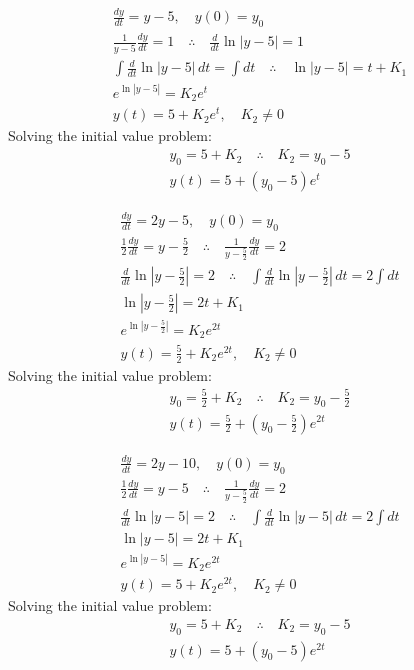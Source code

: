 \begin{solution}
	\begin{solparts}
		\item
		\begin{gather*}
			\frac{dy}{dt}=y-5, \quad y(0)=y_0\\
			\frac{1}{y-5}\frac{dy}{dt}=1 \quad \therefore \quad \frac{d}{dt}\ln|y-5|=1\\
			\int \frac{d}{dt}\ln|y-5| \, dt=\int dt \quad \therefore \quad \ln|y-5|=t+K_1\\
			e^{\ln|y-5|}=K_2e^t\\
			y(t)=5+K_2e^t,\quad K_2 \neq 0
		\end{gather*}
			Solving the initial value problem:
		\begin{gather*}
			y_0=5+K_2 \quad \therefore \quad K_2=y_0-5\\
			\boxed{y(t)=5+(y_0-5)e^t}
		\end{gather*}
		
		\item 
		\begin{gather*}
			\frac{dy}{dt}=2y-5, \quad y(0)=y_0\\
			\frac{1}{2}\frac{dy}{dt}=y-\frac{5}{2}\quad \therefore \quad \frac{1}{y-\frac{5}{2}}\frac{dy}{dt}=2\\
			\frac{d}{dt}\ln\left|y-\frac{5}{2}\right|=2 \quad \therefore \quad \int \frac{d}{dt}\ln\left|y-\frac{5}{2}\right|\, dt=2\int dt\\
			\ln\left|y-\frac{5}{2}\right|=2t+K_1\\
			e^{\ln\left|y-\frac{5}{2}\right|}=K_2e^{2t}\\
			y(t)=\frac{5}{2}+K_2e^{2t}, \quad K_2 \neq 0
		\end{gather*}
			Solving the initial value problem:
		\begin{gather*}	
			y_0=\frac{5}{2}+K_2 \quad \therefore \quad K_2=y_0-\frac{5}{2}\\
			\boxed{y(t)=\frac{5}{2}+\left(y_0-\frac{5}{2}\right)e^{2t}}
		\end{gather*}
	
		\item 
		\begin{gather*}
			\frac{dy}{dt}=2y-10, \quad y(0)=y_0\\
			\frac{1}{2}\frac{dy}{dt}=y-5\quad \therefore \quad \frac{1}{y-\frac{5}{2}}\frac{dy}{dt}=2\\
			\frac{d}{dt}\ln|y-5|=2 \quad \therefore \quad \int \frac{d}{dt}\ln|y-5|\, dt=2\int dt\\
			\ln|y-5|=2t+K_1\\
			e^{\ln|y-5|}=K_2e^{2t}\\
			y(t)=5+K_2e^{2t}, \quad K_2 \neq 0
		\end{gather*}
			Solving the initial value problem:
		\begin{gather*}
			y_0=5+K_2 \quad \therefore \quad K_2=y_0-5\\
			\boxed{y(t)=5+(y_0-5)e^{2t}}
		\end{gather*}
	\end{solparts}
\end{solution}

